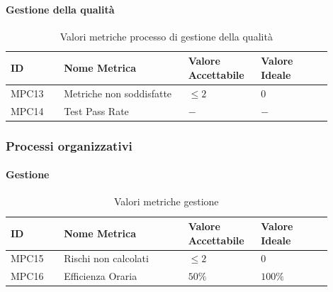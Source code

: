 \documentclass[a4paper,12pt]{article}
\begin{document}
                \paragraph{Gestione della qualità} \mbox{}
                    \begin{longtable}{|M{0.15\linewidth}|M{0.35\linewidth}|M{0.2\linewidth}|M{0.2\linewidth}|}

                        \caption{Valori metriche processo di gestione della qualità} \\
                        \hline
                        \textbf{ID} & \textbf{Nome Metrica} & \textbf{Valore Accettabile} & \textbf{Valore Ideale} \\
                        \hline
                        \endhead

                        MPC13 & Metriche non soddisfatte & $\le 2$ & $0$ \\
                        \hline

                        MPC14 & Test Pass Rate & $-$ & $-$ \\
                        \hline

                    \end{longtable}


            \subsubsection{Processi organizzativi}
                \paragraph{Gestione} \mbox{}
                    \begin{longtable}{|M{0.15\linewidth}|M{0.35\linewidth}|M{0.2\linewidth}|M{0.2\linewidth}|}

                        \caption{Valori metriche gestione} \\
                        \hline
                        \textbf{ID} & \textbf{Nome Metrica} & \textbf{Valore Accettabile} & \textbf{Valore Ideale} \\
                        \hline
                        \endhead

                        MPC15 & Rischi non calcolati & $\le 2$ & $0$ \\
                        \hline

                        MPC16 & Efficienza Oraria & $50\%$ & $100\%$ \\
                        \hline

                    \end{longtable}
\end{document}
